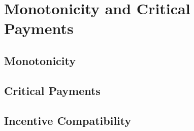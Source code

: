 
\chapter{Monotonicity and Critical Payments}\label{chapter:monotonicity&criticalpayment}

\section{Monotonicity}
\section{Critical Payments}
\section{Incentive Compatibility}
